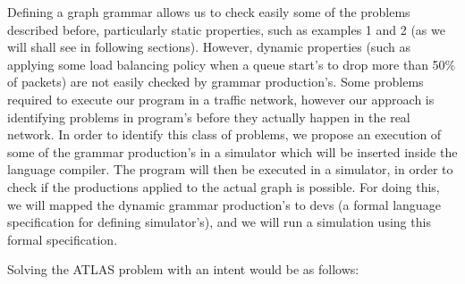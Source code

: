 \documentclass[envcountsect,runningheads]{llncs}
\begin{document}
Defining a graph grammar allows us to check easily some of the problems described 
before, particularly static properties, such as examples 1 and 2 (as we will shall see in following
sections). However, dynamic properties (such as applying some load balancing policy when a 
queue start's to drop more than 50\% of packets) are not easily checked by grammar 
production's. Some problems required to execute our program in a traffic network, 
however our approach is identifying problems in program's before they actually 
happen in the real network. In order to identify this class of problems, we 
propose an execution of some of the grammar production's in a simulator which 
will be inserted inside the language compiler. The program will then be executed 
in a simulator, in order to check if the productions applied to the actual graph is 
possible. For doing this, we will mapped the dynamic grammar production's to 
devs (a formal language specification for defining simulator's), and we will run a simulation 
using this formal specification.\\

\newpage

Solving the ATLAS problem with an intent would be as follows:
\end{document}
